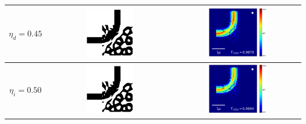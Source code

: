 \begin{table}[ht]
    \centering
    \hspace*{-3cm}
    \begin{tabular}{|c|c|c|}
    \hline
      $\eta_d = 0.45$ &
      \includegraphics[width=0.40\textwidth]{image/results/bend/L-BFGS-B/best/eps_eta_d_256.png } &
      \includegraphics[width=0.50\textwidth]{image/results/bend/L-BFGS-B/best/field_eta_d_256.png} \\
    \hline
      $\eta_i = 0.50$ &
      \includegraphics[width=0.40\textwidth]{image/results/bend/L-BFGS-B/best/eps_eta_i_256.png} &
      \includegraphics[width=0.50\textwidth]{image/results/bend/L-BFGS-B/best/field_eta_i_256.png} \\

\end{tabular}
\end{table}
